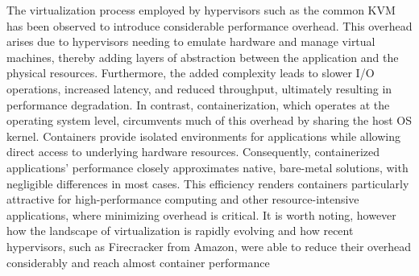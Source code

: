
The virtualization process employed by hypervisors such as the common
KVM\cite{Kivity_2007} has been observed to introduce considerable performance
overhead. This overhead arises due to hypervisors needing to emulate hardware
and manage virtual machines, thereby adding layers of abstraction between the
application and the physical resources. Furthermore, the added complexity leads
to slower I/O operations, increased latency, and reduced throughput, ultimately
resulting in performance degradation. In contrast, containerization, which
operates at the operating system level, circumvents much of this overhead by
sharing the host OS kernel. Containers provide isolated environments for
applications while allowing direct access to underlying hardware resources.
Consequently, containerized applications' performance closely approximates
native, bare-metal solutions, with negligible differences in most cases.  This
efficiency renders containers particularly attractive for high-performance
computing and other resource-intensive applications, where minimizing overhead
is critical. It is worth noting, however how the landscape of virtualization is
rapidly evolving and  how recent hypervisors, such as Firecracker from Amazon,
were able to reduce their overhead considerably and reach almost container
performance\cite{Li_2023}



